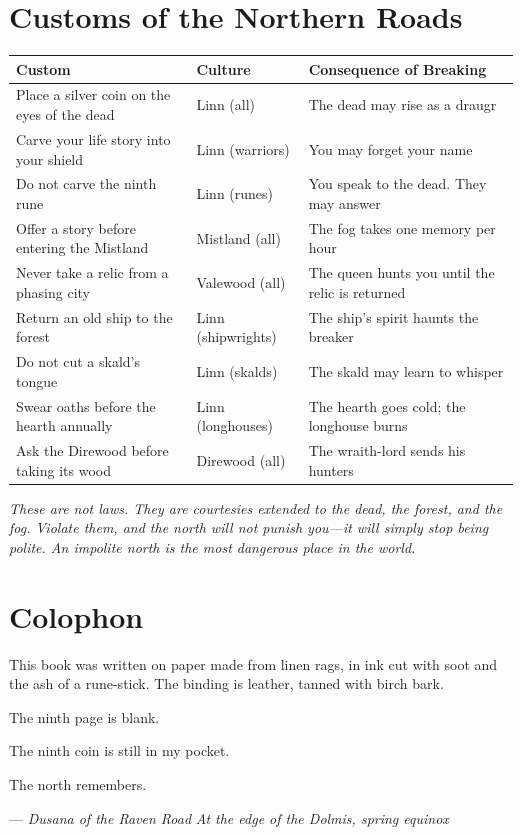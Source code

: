 \documentclass[9pt,a5paper]{extbook}
\begin{document}
\appendix

\chapter{Customs of the Northern Roads}

{\small
\begin{longtable}{@{}p{3cm} p{2.5cm} p{6.5cm}@{}}
\toprule
\textbf{Custom} & \textbf{Culture} & \textbf{Consequence of Breaking} \\
\midrule
Place a silver coin on the eyes of the dead & Linn (all) & The dead may rise as a draugr \\
Carve your life story into your shield & Linn (warriors) & You may forget your name \\
Do not carve the ninth rune & Linn (runes) & You speak to the dead. They may answer \\
Offer a story before entering the Mistland & Mistland (all) & The fog takes one memory per hour \\
Never take a relic from a phasing city & Valewood (all) & The queen hunts you until the relic is returned \\
Return an old ship to the forest & Linn (shipwrights) & The ship's spirit haunts the breaker \\
Do not cut a skald's tongue & Linn (skalds) & The skald may learn to whisper \\
Swear oaths before the hearth annually & Linn (longhouses) & The hearth goes cold; the longhouse burns \\
Ask the Direwood before taking its wood & Direwood (all) & The wraith-lord sends his hunters \\
\bottomrule
\end{longtable}
}

\vspace{0.5cm}
\noindent \textit{These are not laws. They are courtesies extended to the dead, the forest, and the fog. Violate them, and the north will not punish you---it will simply stop being polite. An impolite north is the most dangerous place in the world.}

\clearpage

\chapter*{Colophon}

This book was written on paper made from linen rags, in ink cut with soot and the ash of a rune-stick. The binding is leather, tanned with birch bark.

The ninth page is blank.

The ninth coin is still in my pocket.

The north remembers.

\hfill --- \textit{Dusana of the Raven Road}
\vspace{0.5cm}
\hfill \textit{At the edge of the Dolmis, spring equinox}
\end{document}
